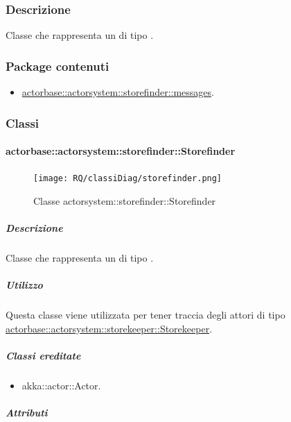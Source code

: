 \documentclass{scalatekids-article}
\begin{document}
\subsubsection{Descrizione}
Classe che rappresenta un  di tipo .

\subsubsection{Package contenuti}
\begin{itemize}
\item \hyperref[sec:actorbase::actorsystem::storefinder::messages]{actorbase::actorsystem::storefinder::messages}.
\end{itemize}

\subsubsection{Classi}

\paragraph{actorbase::actorsystem::storefinder::Storefinder}
\label{sec:actorbase::actorsystem::storefinder::Storefinder}

\begin{figure}[H]
   \begin{center}
     \texttt{[image: RQ/classiDiag/storefinder.png]}
     \caption{Classe actorsystem::storefinder::Storefinder}
   \end{center}
 \end{figure}

\subparagraph{Descrizione}

Classe che rappresenta un  di tipo .

\subparagraph{Utilizzo}
Questa classe viene utilizzata per tener traccia degli attori di tipo
\hyperref[sec:actorbase::actorsystem::storekeeper::Storekeeper]{actorbase::actorsystem::storekeeper::Storekeeper}.

\subparagraph{Classi ereditate}

\begin{itemize}

\item akka::actor::Actor.

\end{itemize}

\subparagraph{Attributi}
\end{document}
